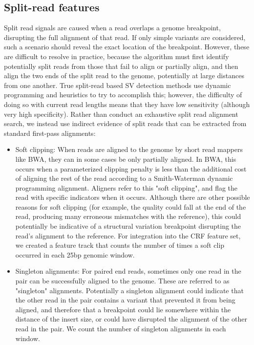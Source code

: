 \subsection{Split-read features}

Split read signals are caused when a read overlaps a genome breakpoint, disrupting the full alignment of that read. If only simple variants are considered, such a scenario should reveal the exact location of the breakpoint. However, these are difficult to resolve in practice, because the algorithm must first identify potentially split reads from those that fail to align or partially align, and then align the two ends of the split read to the genome, potentially at large distances from one another. True split-read based SV detection methods use dynamic programming and heuristics to try to accomplish this; however, the difficulty of doing so with current read lengths means that they have low sensitivity (although very high specificity). Rather than conduct an exhaustive split read alignment search, we instead use indirect evidence of split reads that can be extracted from standard first-pass alignments:

\begin{itemize}
\item Soft clipping: When reads are aligned to the genome by short read mappers like BWA, they can in some cases be only partially aligned. In BWA, this occurs when a parameterized clipping penalty is less than the additional cost of aligning the rest of the read according to a Smith-Waterman dynamic programming alignment. Aligners refer to this "soft clipping", and flag the read with specific indicators when it occurs. Although there are other possible reasons for soft clipping (for example, the quality could fall at the end of the read, producing many erroneous mismatches with the reference), this could potentially be indicative of a structural variation breakpoint disrupting the read's alignment to the reference. For integration into the CRF feature set, we created a feature track that counts the number of times a soft clip occurred in each 25bp genomic window.

\item Singleton alignments: For paired end reads, sometimes only one read in the pair can be successfully aligned to the genome. These are referred to as "singleton" alignments. Potentially a singleton alignment could indicate that the other read in the pair contains a variant that prevented it from being aligned, and therefore that a breakpoint could lie somewhere within the distance of the insert size, or could have disrupted the alignment of the other read in the pair. We count the number of singleton alignments in each window. 
\end{itemize}

